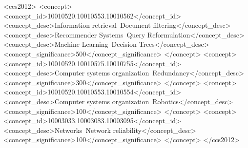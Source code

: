 \documentclass[sigconf]{acmart}
\begin{document}
%
%
\begin{CCSXML}
<ccs2012>
<concept>
  <concept_id>10010520.10010553.10010562</concept_id>
  <concept_desc>Information retrieval~Document filtering</concept_desc>
  <concept_desc>Recommender Systems~Query Reformulation</concept_desc>
  <concept_desc>Machine Learning~Decision Trees</concept_desc>
  <concept_significance>500</concept_significance>
 </concept>
 <concept>
  <concept_id>10010520.10010575.10010755</concept_id>
  <concept_desc>Computer systems organization~Redundancy</concept_desc>
  <concept_significance>300</concept_significance>
 </concept>
 <concept>
  <concept_id>10010520.10010553.10010554</concept_id>
  <concept_desc>Computer systems organization~Robotics</concept_desc>
  <concept_significance>100</concept_significance>
 </concept>
 <concept>
  <concept_id>10003033.10003083.10003095</concept_id>
  <concept_desc>Networks~Network reliability</concept_desc>
  <concept_significance>100</concept_significance>
 </concept>
</ccs2012>  
\end{CCSXML}





\maketitle


\end{document}
